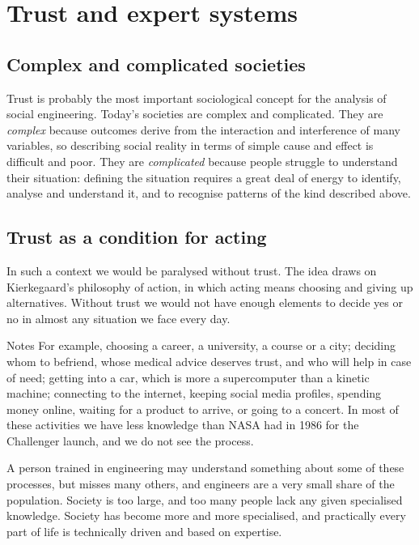 \section{Trust and expert systems}

\subsection{Complex and complicated societies}
Trust is probably the most important sociological concept for the analysis of social engineering. Today's societies are complex and complicated. They are \emph{complex} because outcomes derive from the interaction and interference of many variables, so describing social reality in terms of simple cause and effect is difficult and poor. They are \emph{complicated} because people struggle to understand their situation: defining the situation requires a great deal of energy to identify, analyse and understand it, and to recognise patterns of the kind described above.

\subsection{Trust as a condition for acting}
In such a context we would be paralysed without trust. The idea draws on Kierkegaard's philosophy of action, in which acting means choosing and giving up alternatives. Without trust we would not have enough elements to decide yes or no in almost any situation we face every day.

\begin{nota}{Notes}
	For example, choosing a career, a university, a course or a city; deciding whom to befriend, whose medical advice deserves trust, and who will help in case of need; getting into a car, which is more a supercomputer than a kinetic machine; connecting to the internet, keeping social media profiles, spending money online, waiting for a product to arrive, or going to a concert. In most of these activities we have less knowledge than NASA had in 1986 for the Challenger launch, and we do not see the process.
\end{nota}

A person trained in engineering may understand something about some of these processes, but misses many others, and engineers are a very small share of the population. Society is too large, and too many people lack any given specialised knowledge. Society has become more and more specialised, and practically every part of life is technically driven and based on expertise.

